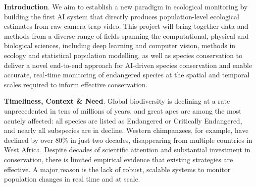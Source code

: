 \textbf{Introduction}. We aim to establish a new paradigm in ecological monitoring by building the first AI system that directly produces population-level ecological estimates from raw camera trap video. This project will bring together data and methods from a diverse range of fields spanning the computational, physical and biological sciences, including deep learning and computer vision, methods in ecology and statistical population modelling, as well as species conservation to deliver a novel end-to-end approach for AI-driven species conservation and enable accurate, real-time monitoring of endangered species at the spatial and temporal scales required to inform effective conservation.



\textbf{Timeliness, Context \& Need}. Global biodiversity is declining at a rate unprecedented in tens of millions of years, and great apes are among the most acutely affected: all species are listed as Endangered or Critically Endangered, and nearly all subspecies are in decline. Western chimpanzees, for example, have declined by over 80\% in just two decades, disappearing from multiple countries in West Africa. Despite decades of scientific attention and substantial investment in conservation, there is limited empirical evidence that existing strategies are effective. A major reason is the lack of robust, scalable systems to monitor population changes in real time and at scale.

